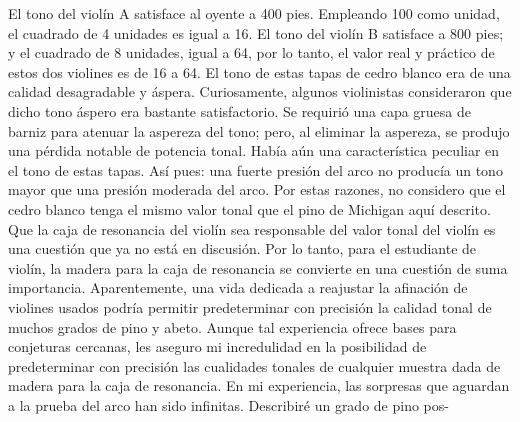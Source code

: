 El tono del violín A satisface al oyente a 400 pies. Empleando 100 como unidad, el cuadrado de 4 unidades es igual a 16. El tono del violín B satisface a 800 pies; y el cuadrado de 8 unidades, igual a 64, por lo tanto, el valor real y práctico de estos dos violines es de 16 a 64. El tono de estas tapas de cedro blanco era de una calidad desagradable y áspera. Curiosamente, algunos violinistas consideraron que dicho tono áspero era bastante satisfactorio. Se requirió una capa gruesa de barniz para atenuar la aspereza del tono; pero, al eliminar la aspereza, se produjo una pérdida notable de potencia tonal. Había aún una característica peculiar en el tono de estas tapas. Así pues: una fuerte presión del arco no producía un tono mayor que una presión moderada del arco. Por estas razones, no considero que el cedro blanco tenga el mismo valor tonal que el pino de Michigan aquí descrito.
Que la caja de resonancia del violín sea responsable del valor tonal del violín es una cuestión que ya no está en discusión. Por lo tanto, para el estudiante de violín, la madera para la caja de resonancia se convierte en una cuestión de suma importancia. Aparentemente, una vida dedicada a reajustar la afinación de violines usados podría permitir predeterminar con precisión la calidad tonal de muchos grados de pino y abeto. Aunque tal experiencia ofrece bases para conjeturas cercanas, les aseguro mi incredulidad en la posibilidad de predeterminar con precisión las cualidades tonales de cualquier muestra dada de madera para la caja de resonancia. En mi experiencia, las sorpresas que aguardan a la prueba del arco han sido infinitas. Describiré un grado de pino pos-

